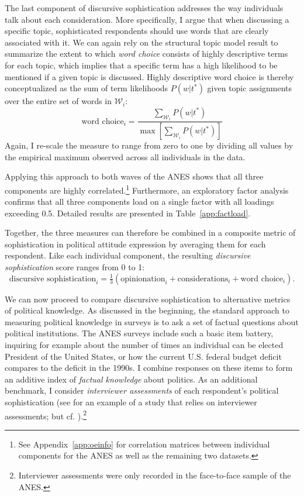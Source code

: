 The last component of discursive sophistication addresses the way individuals talk about each consideration. More specifically, I argue that when discussing a specific topic, sophisticated respondents should use words that are clearly associated with it. We can again rely on the structural topic model result to summarize the extent to which \textit{word choice} consists of highly descriptive terms for each topic, which implies that a specific term has a high likelihood to be mentioned if a given topic is discussed. Highly descriptive word choice is thereby conceptualized as the sum of term likelihoods $P(w|t^*)$ given topic assignments over the entire set of words in $\mathcal{W}_i$:
\begin{equation}
\text{word choice}_i = \dfrac{\sum_{\mathcal{W}_i} P(w|t^*)}{\max\left[\sum_{\mathcal{W}_i} P(w|t^*)\right]}
\end{equation}
Again, I re-scale the measure to range from zero to one by dividing all values by the empirical maximum observed across all individuals in the data.

Applying this approach to both waves of the ANES shows that all three components are highly correlated.\footnote{See Appendix~\ref{app:oeinfo} for correlation matrices between individual components for the ANES as well as the remaining two datasets.} Furthermore, an exploratory factor analysis confirms that all three components load on a single factor with all loadings exceeding 0.5. Detailed results are presented in Table~\ref{app:factload}.



Together, the three measures can therefore be combined in a composite metric of sophistication in political attitude expression by averaging them for each respondent. Like each individual component, the resulting \textit{discursive sophistication} score ranges from 0 to 1:
\begin{equation}
\text{discursive sophistication}_i = \tfrac{1}{3}(\text{opinionation}_i + \text{considerations}_i + \text{word choice}_i).
\end{equation}

We can now proceed to compare discursive sophistication to alternative metrics of political knowledge. As discussed in the beginning, the standard approach to measuring political knowledge in surveys is to ask a set of factual questions about political institutions. The ANES surveys include such a basic item battery, inquiring for example about the number of times an individual can be elected President of the United States, or how the current U.S. federal budget deficit compares to the deficit in the 1990s. I combine responses on these items to form an additive index of \textit{factual knowledge} about politics. As an additional benchmark, I consider \textit{interviewer assessments} of each respondent's political sophistication (see \citealt{bartels2005homer} for an example of a study that relies on interviewer assessments; but cf. \citealt{ryan2011accuracy}).\footnote{Interviewer assessments were only recorded in the face-to-face sample of the ANES.}

